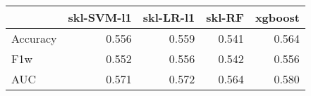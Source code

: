 \begin{tabular}{lrrrr}
\toprule
{} &  skl-SVM-l1 &  skl-LR-l1 &  skl-RF &  xgboost \\
\midrule
Accuracy &       0.556 &      0.559 &   0.541 &    0.564 \\
F1w      &       0.552 &      0.556 &   0.542 &    0.556 \\
AUC      &       0.571 &      0.572 &   0.564 &    0.580 \\
\bottomrule
\end{tabular}
